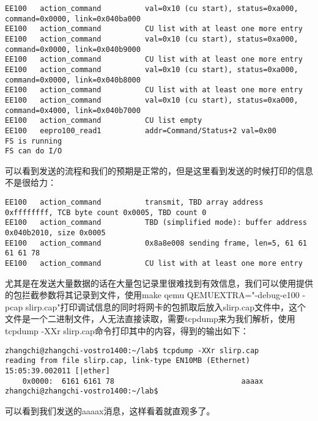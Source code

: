 \documentclass{article}
\begin{document}
\begin{CJK*}{UTF8}{gkai}
\begin{lstlisting}[style=console, basicstyle=\tiny\color{green}\ttfamily\bfseries]
EE100	action_command          val=0x10 (cu start), status=0xa000, command=0x0000, link=0x040ba000
EE100	action_command          CU list with at least one more entry
EE100	action_command          val=0x10 (cu start), status=0xa000, command=0x0000, link=0x040b9000
EE100	action_command          CU list with at least one more entry
EE100	action_command          val=0x10 (cu start), status=0xa000, command=0x0000, link=0x040b8000
EE100	action_command          CU list with at least one more entry
EE100	action_command          val=0x10 (cu start), status=0xa000, command=0x4000, link=0x040b7000
EE100	action_command          CU list empty
EE100	eepro100_read1          addr=Command/Status+2 val=0x00
FS is running
FS can do I/O
\end{lstlisting}

可以看到发送的流程和我们的预期是正常的，但是这里看到发送的时候打印的信息不是很给力：

\begin{lstlisting}[style=console, basicstyle=\tiny\color{green}\ttfamily\bfseries]
EE100	action_command          transmit, TBD array address 0xffffffff, TCB byte count 0x0005, TBD count 0
EE100	action_command          TBD (simplified mode): buffer address 0x040b2010, size 0x0005
EE100	action_command          0x8a8e008 sending frame, len=5, 61 61 61 61 78
EE100	action_command          CU list with at least one more entry
\end{lstlisting}

尤其是在发送大量数据的话在大量包记录里很难找到有效信息，我们可以使用提供的包拦截参数将其记录到文件，使用make qemu QEMUEXTRA="-debug-e100 -pcap slirp.cap"打印调试信息的同时将网卡的包抓取后放入slirp.cap文件中，这个文件是一个二进制文件，人无法直接读取，需要tcpdump来为我们解析，使用tcpdump -XXr slirp.cap命令打印其中的内容，得到的输出如下：


\begin{lstlisting}[style=console]
zhangchi@zhangchi-vostro1400:~/lab$ tcpdump -XXr slirp.cap 
reading from file slirp.cap, link-type EN10MB (Ethernet)
15:05:39.002011 [|ether]
	0x0000:  6161 6161 78                             aaaax
zhangchi@zhangchi-vostro1400:~/lab$ 
\end{lstlisting}

可以看到我们发送的aaaax消息，这样看着就直观多了。





\begin{lstlisting}[style=exercise]
\end{lstlisting}



\end{CJK*}
\end{document}
